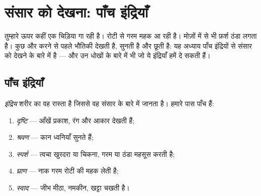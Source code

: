 \chapter{संसार को देखना: पाँच इंद्रियाँ}\label{ch:g1:five-senses}

तुम्हारे ऊपर कहीं एक चिड़िया गा रही है। रोटी से गरम महक आ रही है।
मोज़ों में से भी फ़र्श ठंडा लगता है। कुछ और करने से पहले भौतिकी
देखती है, सुनती है और छूती है: यह अध्याय पाँच इंद्रियों से संसार को
देखने के बारे में है --- और उन धोखों के बारे में भी जो ये इंद्रियाँ
हमें दे सकती हैं।

\section{पाँच इंद्रियाँ}

\begin{definition}[पाँच इंद्रियाँ]\label{def:g1:five-senses:senses}
\emph{इंद्रिय} शरीर का वह रास्ता है जिससे वह संसार के
बारे में जानता है। हमारे पास पाँच हैं:
\begin{enumerate}
  \item \emph{दृष्टि} --- आँखें प्रकाश, रंग और आकार
        देखती हैं;
  \item \emph{श्रवण} --- कान ध्वनियाँ सुनते हैं;
  \item \emph{स्पर्श} --- त्वचा खुरदरा या चिकना, गरम
        या ठंडा महसूस करती है;
  \item \emph{घ्राण} --- नाक गरम रोटी की महक लेती है;
  \item \emph{स्वाद} --- जीभ मीठा, नमकीन, खट्टा चखती
        है।
\end{enumerate}
\end{definition}

